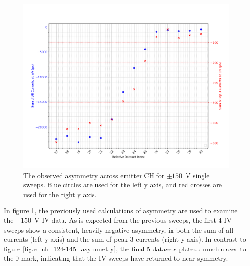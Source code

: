 \begin{refsection}
\begin{figure}[H]
    \centering
    \includegraphics[width=\linewidth]{Chapter7/Figs/Raster/Emitters/146-159_asymmetry.png}
    \caption{The observed asymmetry across emitter CH for $\pm150$~\si{\volt} single sweeps. Blue circles are used for the left y axis, and red crosses are used for the right y axis.}
    \label{fig:e_ch_146-159_asymmetry}
\end{figure}

In figure \ref{fig:e_ch_146-159_asymmetry}, the previously used calculations of asymmetry are used to examine the $\pm150$~\si{\volt} IV data. As is expected from the previous sweeps, the first 4 IV sweeps show a consistent, heavily negative asymmetry, in both the sum of all currents (left y axis) and the sum of peak 3 currents (right y axis). In contrast to figure \ref{fig:e_ch_124-145_asymmetry}, the final 5 datasets plateau much closer to the 0 mark, indicating that the IV sweeps have returned to near-symmetry.


\end{refsection}
